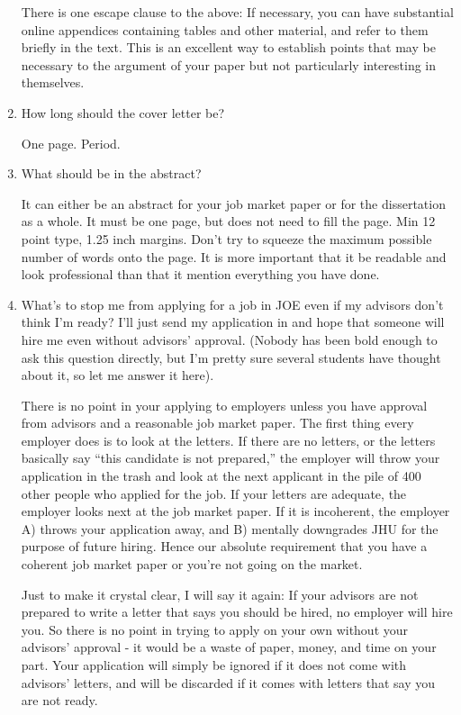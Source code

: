 \documentclass{econtex}
\begin{document}
\begin{enumerate}
  There is one escape clause to the above: If necessary, you can have
  substantial online appendices containing tables and other material, and
  refer to them briefly in the text.  This is an excellent way to
  establish points that may be necessary to the argument of your paper
  but not particularly interesting in themselves.   

\item How long should the cover letter be?

  One page.  Period.

\item What should be in the abstract?

  It can either be an abstract for your job market paper or for the dissertation 
as a whole.  It must be one page, but does not need to fill the page.  Min 12 point
type, 1.25 inch margins.  Don't try to squeeze the maximum possible number of words onto
the page.  It is more important that it be readable and look professional than that 
it mention everything you have done.

\item What's to stop me from applying for a job in JOE even if my advisors don't think I'm ready?  I'll just send 
my application in and hope that someone will hire me even without advisors' approval.  (Nobody 
has been bold enough to ask this question directly, but I'm pretty sure several students have thought about it,
so let me answer it here).

There is no point in your applying to employers unless you have
approval from advisors and a reasonable job market paper.  The first
thing every employer does is to look at the letters.  If there are no
letters, or the letters basically say ``this candidate is not
prepared,'' the employer will throw your application in the trash and
look at the next applicant in the pile of 400 other people who applied
for the job.  If your letters are adequate, the employer looks next at
the job market paper.  If it is incoherent, the employer A) throws
your application away, and B) mentally downgrades JHU for the purpose
of future hiring.  Hence our absolute requirement that you have a coherent
job market paper or you're not going on the market.

Just to make it crystal clear, I will say it again: If your advisors
are not prepared to write a letter that says you should be hired, no
employer will hire you.  So there is no point in trying to apply on
your own without your advisors' approval - it would be a waste of
paper, money, and time on your part.  Your application will simply be
ignored if it does not come with advisors' letters, and will be discarded
if it comes with letters that say you are not ready.


\end{enumerate}
\end{document}
